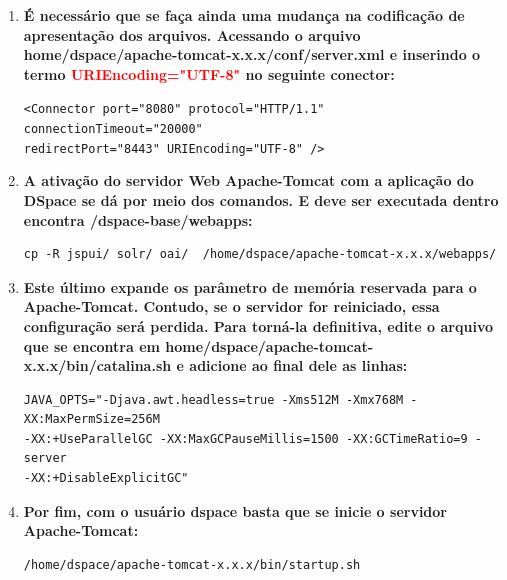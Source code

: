 \documentclass[12pt,hidelinks]{article}
\begin{document}
\begin{enumerate}
        
        \newpage

        \item \textbf{É necessário que se faça ainda uma mudança na codificação de apresentação dos arquivos. Acessando o arquivo home/dspace/apache-tomcat-x.x.x/conf/server.xml e inserindo o termo \textcolor{red}{URIEncoding="UTF-8"} no seguinte conector:}
        
            \texttt{<Connector port="8080" protocol="HTTP/1.1"\\
                    connectionTimeout="20000"\\
                    redirectPort="8443" URIEncoding="UTF-8" />}\\
            
        
        \item \textbf{A ativação do servidor Web Apache-Tomcat com a aplicação do DSpace se dá por meio dos comandos. E deve ser executada dentro encontra /dspace-base/webapps:}\\
            
         \begin{verbatim}
cp -R jspui/ solr/ oai/  /home/dspace/apache-tomcat-x.x.x/webapps/
         \end{verbatim}
         
          \item \textbf{Este último expande os parâmetro de memória reservada para o Apache-Tomcat. Contudo, se o servidor for reiniciado, essa configuração será perdida. Para torná-la definitiva, edite o arquivo que se encontra em home/dspace/apache-tomcat-x.x.x/bin/catalina.sh e adicione ao final dele as linhas:}\\
          
            \begin{verbatim}
JAVA_OPTS="-Djava.awt.headless=true -Xms512M -Xmx768M -XX:MaxPermSize=256M 
-XX:+UseParallelGC -XX:MaxGCPauseMillis=1500 -XX:GCTimeRatio=9 -server
-XX:+DisableExplicitGC"
            \end{verbatim}
         
         \item \textbf{Por fim, com o usuário dspace basta que se inicie o servidor Apache-Tomcat:}\\

            \begin{verbatim}
/home/dspace/apache-tomcat-x.x.x/bin/startup.sh
            \end{verbatim}
            

\end{enumerate}
\end{document}
